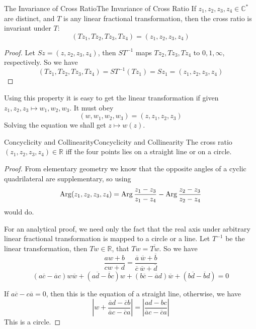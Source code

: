 \documentclass[../main.tex]{subfiles}
\begin{document}
\begin{theorem}{The Invariance of Cross Ratio}{The Invariance of Cross Ratio}
If $z_1,z_2,z_3,z_4\in \mathbb{C}^*$ are distinct, and $T$ is any linear fractional transformation, then the cross ratio is invariant under $T$:
\begin{equation}
	(Tz_1,Tz_2,Tz_3,Tz_4) = (z_1,z_2,z_3,z_4)
\end{equation}
\end{theorem}
\begin{proof}
Let $Sz = (z,z_2,z_3,z_4)$, then $ST^{-1}$ maps $Tz_2,Tz_3,Tz_4$ to $0,1,\infty $, respectively. So we have
\begin{equation*}
	(Tz_1,Tz_2,Tz_3,Tz_4) = ST^{-1}(Tz_1) = Sz_1 = (z_1,z_2,z_3,z_4)
\end{equation*}
\end{proof}

Using this property it is easy to get the linear transformation if given $z_1,z_2,z_3 \mapsto w_1,w_2,w_3$. It must obey
\begin{equation}
	(w,w_1,w_2,w_3) = (z,z_1,z_2,z_3)
\end{equation}
Solving the equation we shall get $z \mapsto w(z)$.

\begin{theorem}{Concyclicity and Collinearity}{Concyclicity and Collinearity}
The cross ratio $(z_1,z_2,z_3,z_4) \in \mathbb{R}$ iff the four points lies on a straight line or on a circle.
\end{theorem}
\begin{proof}
From elementary geometry we know that the opposite angles of a cyclic quadrilateral are supplementary, so using
\begin{equation*}
	\operatorname{Arg} (z_1,z_2,z_3,z_4) = \operatorname{Arg} \frac{z_1-z_3}{z_1-z_4} - \operatorname{Arg} \frac{z_2-z_3}{z_2-z_4}
\end{equation*}
would do.

For an analytical proof, we need only the fact that the real axis under arbitrary linear fractional transformation is mapped to a circle or a line. Let $T^{-1}$ be the linear transformation, then $Tw\in \mathbb{R}$, that $Tw = \overline{Tw}$. So we have
\begin{equation*}
	\frac{aw+b}{cw+d} = \frac{\overline{a}\ \overline{w}+\overline{b}}{\overline{c}\ \overline{w}+\overline{d}}
\end{equation*}
\begin{equation*}
	\left( a \overline{c} - \overline{a} c \right) w \overline{w} + \left( a \overline{d} - \overline{b} c \right) w + \left( b \overline{c} - \overline{a} d \right) \overline{w} + \left( b \overline{d} - \overline{b} d \right) = 0
\end{equation*}

If $a \overline{c} - c \overline{a} = 0$, then this is the equation of a straight line, otherwise, we have
\begin{equation*}
	\left|w + \frac{\overline{a}d-\overline{c}b}{\overline{a}c-\overline{c}a}\right| = \left|\frac{ad-bc}{\overline{a}c-\overline{c}a}\right|
\end{equation*}
This is a circle.
\end{proof}
\end{document}
